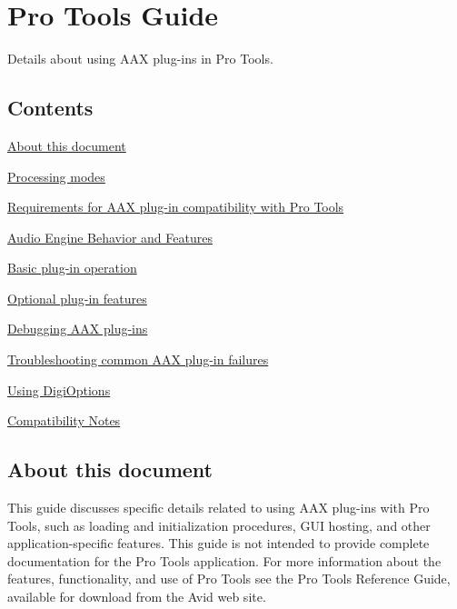 \hypertarget{a00360}{}\section{Pro Tools Guide}
\label{a00360}
Details about using A\+A\+X plug-\/ins in Pro Tools. 

\hypertarget{a00360_aax_pro_tools_guide_contents}{}\subsection{Contents}\label{a00360_aax_pro_tools_guide_contents}
\begin{DoxyItemize}
\item \hyperlink{a00360_aax_pro_tools_guide_00_about_this_document}{About this document} \item \hyperlink{a00360_aax_pro_tools_guide_01_processing_modes}{Processing modes} \item \hyperlink{a00360_aax_pro_tools_guide_02_requirements_for_aax_plugin_compatibility_with_pro_tools}{Requirements for A\+A\+X plug-\/in compatibility with Pro Tools} \item \hyperlink{a00360_aax_pro_tools_guide_03_audio_engine_behavior}{Audio Engine Behavior and Features} \item \hyperlink{a00360_aax_pro_tools_guide_04_basic_plugin_operation}{Basic plug-\/in operation} \item \hyperlink{a00360_aax_pro_tools_guide_05_optional_plugin_features}{Optional plug-\/in features} \item \hyperlink{a00360_aax_pro_tools_guide_06_debugging_aax_plugins}{Debugging A\+A\+X plug-\/ins} \item \hyperlink{a00360_aax_pro_tools_guide_06b_troubleshooting_aax_plugin_failures}{Troubleshooting common A\+A\+X plug-\/in failures} \item \hyperlink{a00360_aax_pro_tools_guide_06c_digioptions}{Using Digi\+Options} \item \hyperlink{a00360_aax_pro_tools_guide_07_compatibility_notes}{Compatibility Notes}\end{DoxyItemize}
 \hypertarget{a00360_aax_pro_tools_guide_00_about_this_document}{}\subsection{About this document}\label{a00360_aax_pro_tools_guide_00_about_this_document}
This guide discusses specific details related to using A\+A\+X plug-\/ins with Pro Tools, such as loading and initialization procedures, G\+U\+I hosting, and other application-\/specific features. This guide is not intended to provide complete documentation for the Pro Tools application. For more information about the features, functionality, and use of Pro Tools see the Pro Tools Reference Guide, available for download from the Avid web site.

